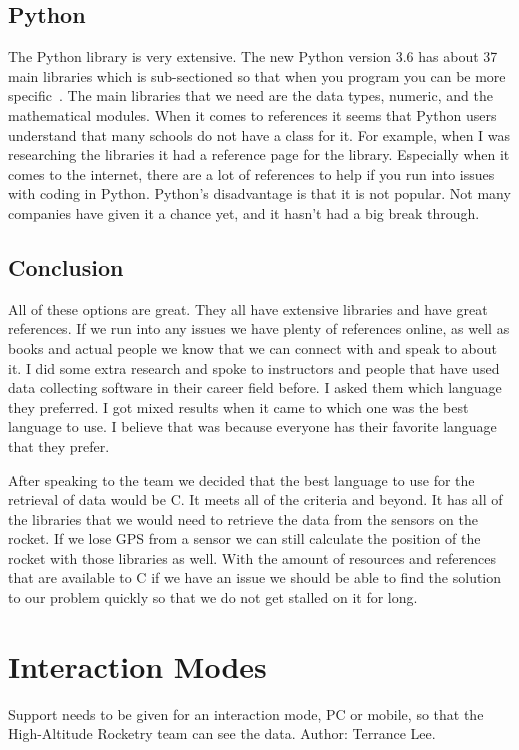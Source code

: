 \documentclass[10pt,draftclsnofoot,onecolumn]{IEEEtran}
\begin{document}
	\subsection{Python}
   	The Python library is very extensive. 
	The new Python version 3.6 has about 37 main libraries which is sub-sectioned so that when you program you can be more specific~\cite{the-python-standard-library}.
	The main libraries that we need are the data types, numeric, and the mathematical modules. 
	When it comes to references it seems that Python users understand that many schools do not have a class for it. 
	For example, when I was researching the libraries it had a reference page for the library. 
	Especially when it comes to the internet, there are a lot of references to help if you run into issues with coding in Python.
	Python’s disadvantage is that it is not popular. 
	Not many companies have given it a chance yet, and it hasn’t had a big break through.  
  
   	
   	\subsection{Conclusion}
   	All of these options are great. They all have extensive libraries and have great references. 
	If we run into any issues we have plenty of references online, as well as books and actual people we know that we can connect
	with and speak to about it. 
	I did some extra research and spoke to instructors and people that have used data collecting software in their career field
	before. 
	I asked them which language they preferred. 
	I got mixed results when it came to which one was the best language to use. 
	I believe that was because everyone has their favorite language that they prefer. 
	
   	After speaking to the team we decided that the best language to use for the retrieval of data would be C. 
	It meets all of the criteria and beyond. 
	It has all of the libraries that we would need to retrieve the data from the sensors on the rocket. 
	If we lose GPS from a sensor we can still calculate the position of the rocket with those libraries as well. 
	With the amount of resources and references that are available to C if we have an issue we should be able to find the solution
	to our problem quickly so that we do not get stalled on it for long.  
    
    \section{Interaction Modes}
 	Support needs to be given for an interaction mode, PC or mobile, so that the High-Altitude Rocketry team can see the data. Author: Terrance Lee.
\end{document}
